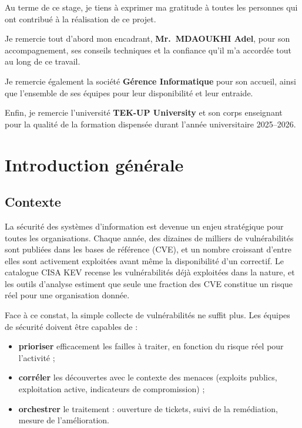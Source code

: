 \documentclass[11pt,a4paper]{article}
\begin{document}
Au terme de ce stage, je tiens \`a exprimer ma gratitude \`a toutes les personnes
qui ont contribu\'e \`a la r\'ealisation de ce projet.

Je remercie tout d'abord mon encadrant, \textbf{Mr.~MDAOUKHI Adel}, pour son
accompagnement, ses conseils techniques et la confiance qu'il m'a accord\'ee tout
au long de ce travail.

Je remercie \'egalement la soci\'et\'e \textbf{G\'erence Informatique} pour son
accueil, ainsi que l'ensemble de ses \'equipes pour leur disponibilit\'e et leur
entraide.

Enfin, je remercie l'universit\'e \textbf{TEK-UP University} et son corps
enseignant pour la qualit\'e de la formation dispens\'ee durant l'ann\'ee
universitaire 2025--2026.

\clearpage

\tableofcontents
\clearpage

\section{Introduction g\'en\'erale}

\subsection{Contexte}

La s\'ecurit\'e des syst\`emes d'information est devenue un enjeu
strat\'egique pour toutes les organisations. Chaque ann\'ee, des dizaines de
milliers de vuln\'erabilit\'es sont publi\'ees dans les bases de r\'ef\'erence
(CVE), et un nombre croissant d'entre elles sont activement exploit\'ees avant
m\^eme la disponibilit\'e d'un correctif. Le catalogue CISA KEV recense les
vuln\'erabilit\'es d\'ej\`a exploit\'ees dans la nature, et les outils
d'analyse estiment que seule une fraction des CVE constitue un risque r\'eel
pour une organisation donn\'ee.

Face \`a ce constat, la simple collecte de vuln\'erabilit\'es ne suffit plus.
Les \'equipes de s\'ecurit\'e doivent \^etre capables de :

\begin{itemize}[leftmargin=1.6em]
  \item \textbf{prioriser} efficacement les failles \`a traiter, en fonction
        du risque r\'eel pour l'activit\'e ;
  \item \textbf{corr\'eler} les d\'ecouvertes avec le contexte des menaces
        (exploits publics, exploitation active, indicateurs de compromission) ;
  \item \textbf{orchestrer} le traitement : ouverture de tickets, suivi de la
        rem\'ediation, mesure de l'am\'elioration.
\end{itemize}
\end{document}
